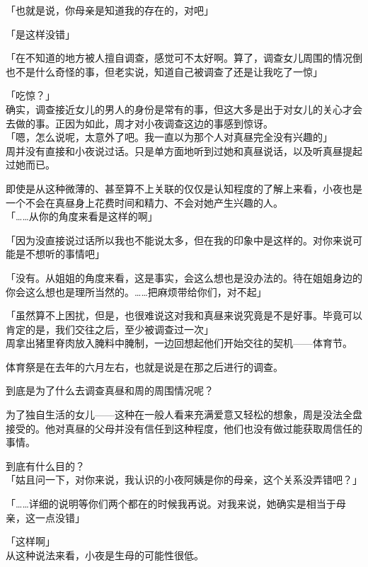 「也就是说，你母亲是知道我的存在的，对吧」

「是这样没错」

「在不知道的地方被人擅自调查，感觉可不太好啊。算了，调查女儿周围的情况倒也不是什么奇怪的事，但老实说，知道自己被调查了还是让我吃了一惊」

「吃惊？」\\

确实，调查接近女儿的男人的身份是常有的事，但这大多是出于对女儿的关心才会去做的事。正因为如此，周才对小夜调查这边的事感到惊讶。\\

「嗯，怎么说呢，太意外了吧。我一直以为那个人对真昼完全没有兴趣的」\\

周并没有直接和小夜说过话。只是单方面地听到过她和真昼说话，以及听真昼提起过她而已。

即使是从这种微薄的、甚至算不上关联的仅仅是认知程度的了解上来看，小夜也是一个不会在真昼身上花费时间和精力、不会对她产生兴趣的人。\\

「……从你的角度来看是这样的啊」

「因为没直接说过话所以我也不能说太多，但在我的印象中是这样的。对你来说可能是不想听的事情吧」

「没有。从姐姐的角度来看，这是事实，会这么想也是没办法的。待在姐姐身边的你会这么想也是理所当然的。……把麻烦带给你们，对不起」

「虽然算不上困扰，但是，也很难说这对我和真昼来说究竟是不是好事。毕竟可以肯定的是，我们交往之后，至少被调查过一次」\\

周拿出猪里脊肉放入腌料中腌制，一边回想起他们开始交往的契机——体育节。

体育祭是在去年的六月左右，也就是说是在那之后进行的调查。

到底是为了什么去调查真昼和周的周围情况呢？

为了独自生活的女儿——这种在一般人看来充满爱意又轻松的想象，周是没法全盘接受的。他对真昼的父母并没有信任到这种程度，他们也没有做过能获取周信任的事情。

到底有什么目的？\\

「姑且问一下，对你来说，我认识的小夜阿姨是你的母亲，这个关系没弄错吧？」

「……详细的说明等你们两个都在的时候我再说。对我来说，她确实是相当于母亲，这一点没错」

「这样啊」\\

从这种说法来看，小夜是生母的可能性很低。


